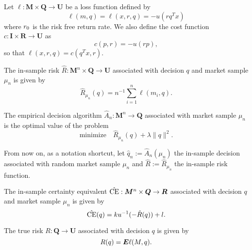 \documentclass[11pt]{article}
\begin{document}
\begin{deff}
  Let $\ell:\bm M\times \bm Q\to\bm U$ be a loss function defined by
  \[
    \ell(m,q) = \ell(x,r,q) = -u(rq^Tx)
  \]
  where $r_0$ is the risk free return rate. We also define the cost function
  $c:\bm I\times\bm R\to\bm U$ as
  \[
    c(p,r) = -u(rp),
  \]
  so that $\ell(x,r,q) = c(q^Tx,r)$. 
\end{deff}

\begin{deff}
  The in-sample risk $\hat R: \bm M^n\times \bm Q \to \bm U$ associated with decision $q$
  and market sample $\mu_n$ is given by
  \[
    \hat R_{\mu_n}(q) = n^{-1} \sum_{i=1}^n \ell(m_i,q).
  \]
\end{deff}

\begin{deff}
  The empirical decision algorithm $\hat A_n:\bm M^n \to \bm Q$ associated with
  market sample $\mu_n$ is the optimal value of the problem
  \[
    \text{minimize}\quad\hat R_{\mu_n}(q) + \lambda\|q\|^2.
  \]
\end{deff}

From now on, as a notation shortcut, let $\hat q_n := \hat A_n(\mu_n)$ the in-sample
decision associated with random market sample $\mu_n$ and $\hat R:=\hat R_{\mu_n}$ the
in-sample risk function.

\begin{deff}
  The in-sample certainty equivalent $\hat{\operatorname{CE}}:\bm M^n\times\bm Q\to\bm R$ associated with
  decision $q$ and market sample $\mu_n$ is given by
  \[
    \hat{\operatorname{CE}}(q) = ku^{-1}(-\hat R(q)) + l.
  \]
\end{deff}


\begin{deff}
  The true risk $R:\bm Q\to\bm U$ associated with decision $q$ is given by
  \[
    R(q) = \bm E\ell(M,q).
  \]
\end{deff}


\end{document}
